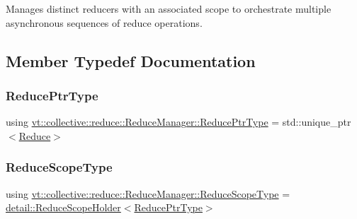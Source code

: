Manages distinct reducers with an associated scope to orchestrate multiple asynchronous sequences of reduce operations. 

\subsection{Member Typedef Documentation}
\mbox{\label{structvt_1_1collective_1_1reduce_1_1_reduce_manager_ae6d6635476f9d9f601d131a334ca3817}} 
\subsubsection{\texorpdfstring{Reduce\+Ptr\+Type}{ReducePtrType}}
{\footnotesize\ttfamily using \hyperlink{structvt_1_1collective_1_1reduce_1_1_reduce_manager_ae6d6635476f9d9f601d131a334ca3817}{vt\+::collective\+::reduce\+::\+Reduce\+Manager\+::\+Reduce\+Ptr\+Type} =  std\+::unique\+\_\+ptr$<$\hyperlink{structvt_1_1collective_1_1reduce_1_1_reduce}{Reduce}$>$}

\mbox{\label{structvt_1_1collective_1_1reduce_1_1_reduce_manager_a2c340e5d3b12e4f2df64b9c1502445cf}} 
\subsubsection{\texorpdfstring{Reduce\+Scope\+Type}{ReduceScopeType}}
{\footnotesize\ttfamily using \hyperlink{structvt_1_1collective_1_1reduce_1_1_reduce_manager_a2c340e5d3b12e4f2df64b9c1502445cf}{vt\+::collective\+::reduce\+::\+Reduce\+Manager\+::\+Reduce\+Scope\+Type} =  \hyperlink{structvt_1_1collective_1_1reduce_1_1detail_1_1_reduce_scope_holder}{detail\+::\+Reduce\+Scope\+Holder}$<$\hyperlink{structvt_1_1collective_1_1reduce_1_1_reduce_manager_ae6d6635476f9d9f601d131a334ca3817}{Reduce\+Ptr\+Type}$>$}



